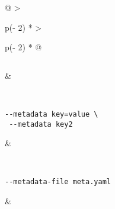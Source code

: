 \begin{longtable}[]{@{}
  >{\raggedright\arraybackslash}p{(\columnwidth - 2\tabcolsep) * }
  >{\raggedright\arraybackslash}p{(\columnwidth - 2\tabcolsep) * }@{}}
\begin{minipage}[t]{\linewidth}
\begin{verbatim}
\end{verbatim}
\end{minipage} & \begin{minipage}[t]{\linewidth}\raggedright
\begin{Shaded}
\begin{Highlighting}[]
\KeywordTok{:}
\AttributeTok{  }\KeywordTok{{-}}
\AttributeTok{  }\KeywordTok{{-}}
\AttributeTok{  }\KeywordTok{{-}}\AttributeTok{ }\KeywordTok{:}
\AttributeTok{    }\KeywordTok{:}
\end{Highlighting}
\end{Shaded}
\end{minipage} \\
\begin{minipage}[t]{\linewidth}\raggedright
\begin{verbatim}
--metadata key=value \
 --metadata key2
\end{verbatim}
\end{minipage} & \begin{minipage}[t]{\linewidth}\raggedright
\begin{Shaded}
\begin{Highlighting}[]
\KeywordTok{:}
\AttributeTok{  }\KeywordTok{:}
\AttributeTok{  }\FunctionTok{key2}\KeywordTok{:}\AttributeTok{ }
\end{Highlighting}
\end{Shaded}
\end{minipage} \\
\begin{minipage}[t]{\linewidth}\raggedright
\begin{verbatim}
--metadata-file meta.yaml
\end{verbatim}
\end{minipage} & \begin{minipage}[t]{\linewidth}\raggedright
\begin{Shaded}
\begin{Highlighting}[]
\KeywordTok{:}
\AttributeTok{  }\KeywordTok{{-}}
\end{Highlighting}
\end{Shaded}


\end{minipage}
\end{longtable}
